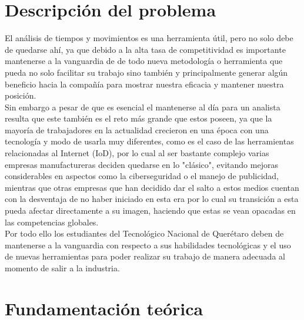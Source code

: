     \section{Descripción del problema}
        El análisis de tiempos y movimientos es una herramienta útil, pero no solo debe de quedarse ahí, ya que debido a la alta tasa de competitividad es importante mantenerse a la vanguardia de de todo nueva metodología o herramienta que pueda no solo facilitar su trabajo sino también y principalmente generar algún beneficio hacia la compañía para mostrar nuestra eficacia y mantener nuestra posición.
        \\Sin embargo a pesar de que es esencial el mantenerse al día para un analista resulta que este también es el reto más grande que estos poseen, ya que la mayoría de trabajadores en la actualidad crecieron en una época con una tecnología y modo de usarla muy diferentes, como es el caso de las herramientas relacionadas al Internet (IoD), por lo cual al ser bastante complejo varias empresas manufactureras deciden quedarse en lo "clásico", evitando mejoras considerables en aspectos como la ciberseguridad o el manejo de publicidad, mientras que otras empresas que han decidido dar el salto a estos medios cuentan con la desventaja de no haber iniciado en esta era por lo cual su transición a esta pueda afectar directamente a su imagen, haciendo que estas se vean opacadas en las competencias globales.\cite{Novatech}
        \\Por todo ello los estudiantes del Tecnológico Nacional de Querétaro deben de mantenerse a la vanguardia con respecto a sus habilidades tecnológicas y el uso de nuevas herramientas para poder realizar su trabajo de manera adecuada al momento de salir a la industria.
    
    
    \section{Fundamentación teórica}
    
    
